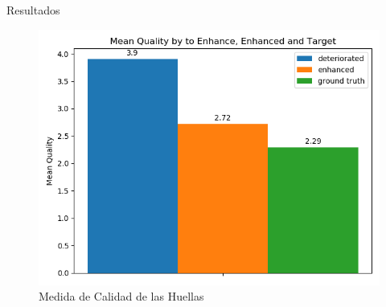 \documentclass[12pt,aspectratio=169]{beamer}
\begin{document}
\begin{frame}{Resultados}

    \begin{figure}
        \includegraphics[scale=0.54]{figs/mean_qualities.png}
        \caption{Medida de Calidad de las Huellas}
    \end{figure}
    
\end{frame}
\end{document}
